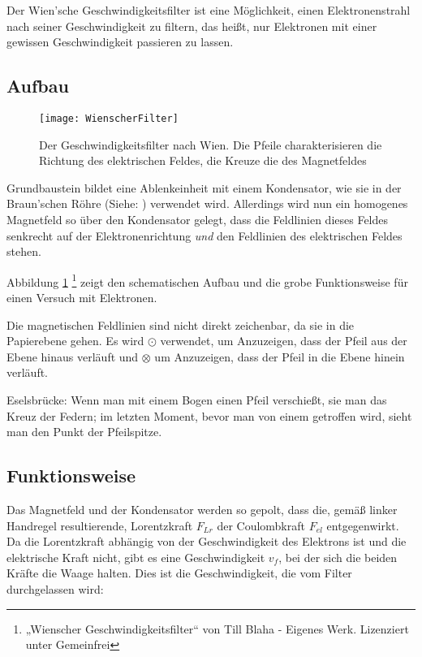 Der Wien'sche Geschwindigkeitsfilter ist eine Möglichkeit, einen Elektronenstrahl nach seiner Geschwindigkeit zu filtern, das heißt, nur Elektronen mit einer gewissen Geschwindigkeit passieren zu lassen.

\subsection{Aufbau}

\begin{figure}[h!]
	\centering
	\vspace*{-10pt}
	\texttt{[image: WienscherFilter]}
	\caption{Der Geschwindigkeitsfilter nach Wien. Die Pfeile charakterisieren die Richtung des elektrischen Feldes, die Kreuze die des Magnetfeldes}
	\label{fig:Wien}
\end{figure}

Grundbaustein bildet eine Ablenkeinheit mit einem Kondensator, wie sie in der Braun'schen Röhre (Siehe: ) verwendet wird. Allerdings wird nun ein homogenes Magnetfeld so über den Kondensator gelegt, dass die Feldlinien dieses Feldes senkrecht auf der Elektronenrichtung \emph{und} den Feldlinien des elektrischen Feldes stehen.

Abbildung \ref{fig:Wien} \footnote{„Wienscher Geschwindigkeitsfilter“ von Till Blaha - Eigenes Werk. Lizenziert unter Gemeinfrei} zeigt den schematischen Aufbau und die grobe Funktionsweise für einen Versuch mit Elektronen.


\begin{Anmerkung}
	Die magnetischen Feldlinien sind nicht direkt zeichenbar, da sie \glqq in die Papierebene\grqq{} gehen. Es wird $\odot$ verwendet, um Anzuzeigen, dass der Pfeil aus der Ebene hinaus verläuft und $\otimes$ um Anzuzeigen, dass der Pfeil in die Ebene hinein verläuft.
	
	Eselsbrücke: Wenn man mit einem Bogen einen Pfeil verschießt, sie man das Kreuz der Federn; im letzten Moment, bevor man von einem getroffen wird, sieht man den Punkt der Pfeilspitze.
\end{Anmerkung}



\subsection{Funktionsweise}

Das Magnetfeld und der Kondensator werden so gepolt, dass die, gemäß linker Handregel resultierende, Lorentzkraft $F_{Lr}$ der Coulombkraft $F_{el}$ entgegenwirkt. Da die Lorentzkraft abhängig von der Geschwindigkeit des Elektrons ist und die elektrische Kraft nicht, gibt es eine Geschwindigkeit $v_f$, bei der sich die beiden Kräfte die Waage halten. Dies ist die Geschwindigkeit, die vom Filter durchgelassen wird:

